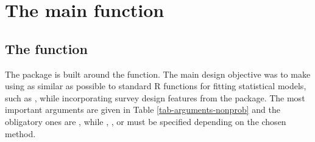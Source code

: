 \documentclass[
]{jss}
\begin{document}
\section{The main function}\label{sec-package}

\subsection[The nonprob function]{The  function}

The  package is built around the 
function. The main design objective was to make using  as
similar as possible to standard R functions for fitting statistical
models, such as , while incorporating survey design
features from the  package. The most important arguments are
given in Table \ref{tab-arguments-nonprob} and the obligatory ones are
, while , , or 
must be specified depending on the chosen method.
\end{document}
